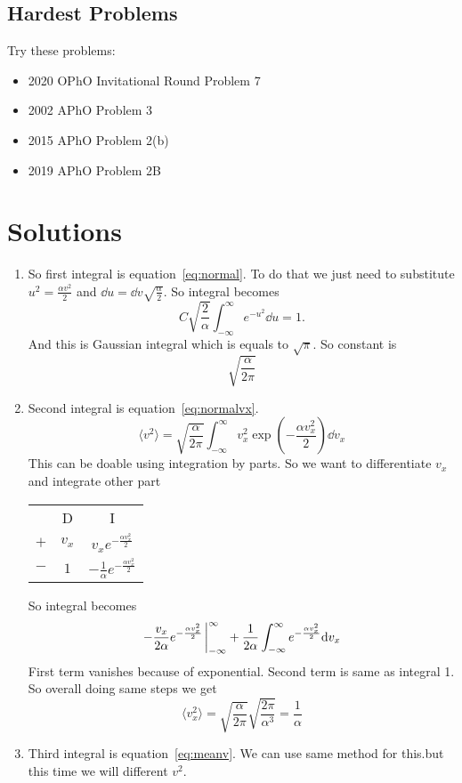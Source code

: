 \documentclass[a4paper, 12pt]{article}
\begin{document}
\subsection{Hardest Problems}
Try these problems:
\begin{itemize}
    \item 2020 OPhO Invitational Round Problem 7
    \item 2002 APhO Problem 3
    \item 2015 APhO Problem 2(b)
    \item 2019 APhO Problem 2B
\end{itemize}
\section{Solutions}
\begin{sol}
    \begin{enumerate}
        \item So first integral is equation~\ref{eq:normal}. To do that we just need to substitute $u^2=\frac{\alpha v^2}{2}$ and $\dd u=\dd v\sqrt{\frac{\alpha}{2}}$. So integral becomes
        $$C\sqrt{\frac{2}{\alpha}} \int_{-\infty}^{\infty}e^{-u^2}\dd u=1.$$ And this is Gaussian integral which is equals to $\sqrt{\pi}$. So constant is
        $$\sqrt{\frac{\alpha}{2\pi}}$$
        \item Second integral is equation~\ref{eq:normalvx}.$$\langle v^2\rangle =\sqrt{\frac{\alpha}{2\pi}}\int_{-\infty}^\infty v_x^2\exp(-\frac{\alpha v_x^2}{2})\dd v_x$$
        This can be doable using integration by parts. So we want to differentiate $v_x$ and integrate other part
        \begin{center}
            \begin{tabular}{ c c c }
                & D & I\\ 
                $+$ & $v_x$& $v_xe^{-\frac{\alpha v_x^2}{2}}$\\
                $-$ & $1$ & $-\frac{1}{\alpha}e^{-\frac{\alpha v_x^2}{2}}$
            \end{tabular}
        \end{center}
        So integral becomes $$-\frac{v_x}{2\alpha}e^{-\frac{\alpha v_x^2}{2}}\eval_{-\infty}^\infty+\frac{1}{2\alpha}\int_{-\infty}^\infty e^{-\frac{\alpha v_x^2}{2}}\dd v_x$$
        First term vanishes because of exponential. Second term is same as integral 1. So overall doing same steps we get
        $$\langle v_x^2\rangle=\sqrt{\frac{\alpha}{2\pi}}\sqrt{\frac{2\pi}{\alpha^3}}=\frac{1}{\alpha} $$
        \item Third integral is equation~\ref{eq:meanv}. We can use same method for this.but this time we will different $v^2$.

\end{enumerate}
\end{sol}
\end{document}
